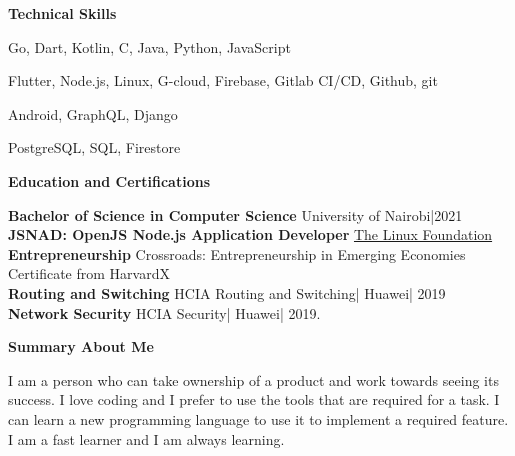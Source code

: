 \documentclass[a4paper]{article}
\begin{document}
\begin{center}
    {\Large \textbf{Technical Skills}}
\end{center}

\begin{description}[noitemsep]
    \item[Languages:] Go, Dart, Kotlin, C, Java, Python, JavaScript
    \item[Platforms and tools:] Flutter, Node.js, Linux, G-cloud, Firebase, Gitlab CI/CD, Github, git
    \item[Frameworks:] Android, GraphQL, Django
    \item[Databases:] PostgreSQL, SQL, Firestore
\end{description}

\begin{center}
    {\Large \textbf{Education and Certifications}}
\end{center}

\textbf{Bachelor of Science in Computer Science} University of Nairobi|2021 \\
\textbf{JSNAD: OpenJS Node.js Application Developer} \href{https://www.credly.com/badges/ab918a14-4dfd-4800-be45-a6a3a8fbd96c/linked_in}{The Linux Foundation} \\
\textbf{Entrepreneurship} Crossroads: Entrepreneurship in Emerging Economies Certificate from HarvardX \\
\textbf{Routing and Switching} HCIA Routing and Switching| Huawei| 2019 \\
\textbf{Network Security} HCIA Security| Huawei| 2019. \par

\begin{center}
    {\Large \textbf{Summary About Me}}
\end{center}

I am a person who can take ownership of a product and work towards seeing its success. I love coding and I prefer to use the tools that are required for a task. I can learn a new programming language to use it to implement a required feature. I am a fast learner and I am always learning.

\end{document}
